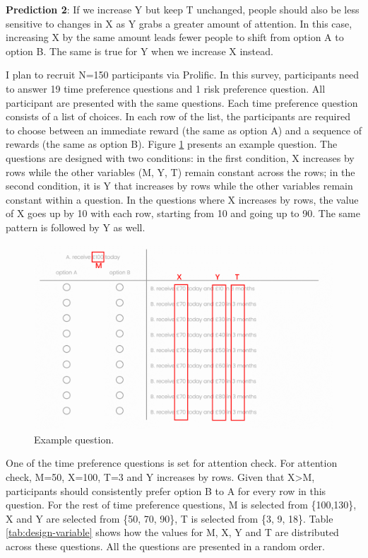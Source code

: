 \documentclass[
  12pt,
]{article}
\begin{document}
\textbf{Prediction 2}: If we increase Y but keep T unchanged, people
should also be less sensitive to changes in X as Y grabs a greater
amount of attention. In this case, increasing X by the same amount leads
fewer people to shift from option A to option B. The same is true for Y
when we increase X instead.

I plan to recruit N=150 participants via Prolific. In this survey,
participants need to answer 19 time preference questions and 1 risk
preference question. All participant are presented with the same
questions. Each time preference question consists of a list of choices.
In each row of the list, the participants are required to choose between
an immediate reward (the same as option A) and a sequence of rewards
(the same as option B). Figure \ref{fig:example-question} presents an
example question. The questions are designed with two conditions: in the
first condition, X increases by rows while the other variables (M, Y, T)
remain constant across the rows; in the second condition, it is Y that
increases by rows while the other variables remain constant within a
question. In the questions where X increases by rows, the value of X
goes up by 10 with each row, starting from 10 and going up to 90. The
same pattern is followed by Y as well.

\begin{figure}
  \centering
  \includegraphics{images/example-question.png}
  \caption{Example question.}
  \label{fig:example-question}
\end{figure}

One of the time preference questions is set for attention check. For
attention check, M=50, X=100, T=3 and Y increases by rows. Given that
X\textgreater M, participants should consistently prefer option B to A
for every row in this question. For the rest of time preference
questions, M is selected from \{100,130\}, X and Y are selected from
\{50, 70, 90\}, T is selected from \{3, 9, 18\}. Table
\ref{tab:design-variable} shows how the values for M, X, Y and T are
distributed across these questions. All the questions are presented in a
random order.
\end{document}

